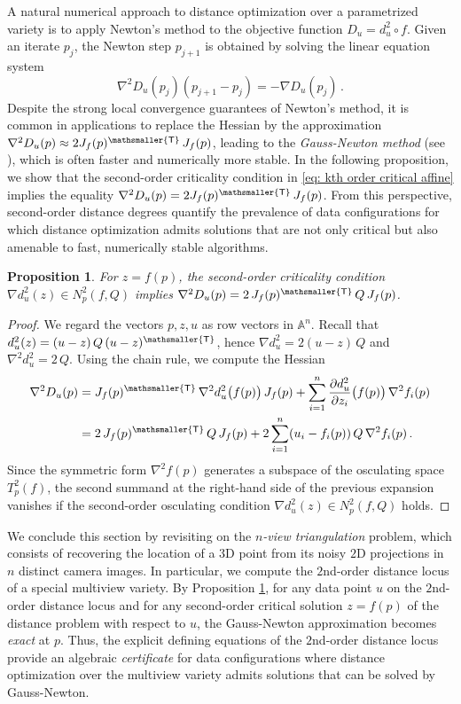 \documentclass[11pt,reqno]{amsart}
\numberwithin{equation}{section}
\theoremstyle{plain}
\numberwithin{theorem}{section}
\newtheorem{proposition}[theorem]{Proposition}
\theoremstyle{definition}
\newcommand{\A}{\mathbb{A}}
\newcommand{\mT}{\mathsmaller{\mathsf{T}}}
\begin{document}
A natural numerical approach to distance optimization over a parametrized variety is to apply Newton's method to the objective function $D_u = d_u^2 \circ f$.
Given an iterate $p_j$, the Newton step $p_{j+1}$ is obtained by solving the linear equation system
\[
    \nabla^2 D_u(p_j)(p_{j+1} - p_j) =  - \nabla D_u(p_j)\,.
\]
Despite the strong local convergence guarantees of Newton's method, it is common in applications to replace the Hessian by the approximation $\nabla^2 D_u(p) \approx 2J_f(p)^\mT\,J_f(p)$, leading to the {\em Gauss-Newton method} (see \cite[Chapter 10.2]{dennis1996numerical}), which is often faster and numerically more stable.
In the following proposition, we show that the second-order criticality condition in \eqref{eq: kth order critical affine} implies the equality $\nabla^2 D_u(p) = 2J_f(p)^\mT\,J_f(p)$. From this perspective, second-order distance degrees quantify the prevalence of data configurations for which distance optimization admits solutions that are not only critical but also amenable to fast, numerically stable algorithms.
\begin{proposition}\label{prop: hessian}
For $z = f(p)$, the second-order criticality condition $\nabla d_u^2(z)\in N_p^2(f,Q)$ implies $\nabla^2D_u(p) = 2\,J_f(p)^\mT\,Q\,J_f(p)$.
\end{proposition}
\begin{proof}
We regard the vectors $p,z,u$ as row vectors in $\A^n$. Recall that $d_u^2(z)=(u-z)\,Q\,(u-z)^\mT$, hence $\nabla d_u^2 = 2(u-z)\,Q$ and $\nabla^2 d_u^2 = 2\,Q$.
Using the chain rule, we compute the Hessian
\begin{align*}
    \nabla^2D_u(p) &= J_f(p)^\mT\,\nabla^2 d_u^2\bigl(f(p)\bigr)\,J_f(p)+\sum_{i=1}^n\frac{\partial d_u^2}{\partial z_i}\bigl(f(p)\bigr)\,\nabla^2 f_i(p)\\
    &= 2\,J_f(p)^\mT\,Q\,J_f(p)+2\sum_{i=1}^n (u_i-f_i(p))\,Q\,\nabla^2 f_i(p)\,.
\end{align*}
Since the symmetric form $\nabla^2 f(p)$ generates a subspace of the osculating space $T_p^2(f)$, the second summand at the right-hand side of the previous expansion vanishes if the second-order osculating condition $\nabla d_u^2(z)\in N_p^2(f,Q)$ holds.
\end{proof}
We conclude this section by revisiting \cite[Example 3.3]{DHOST} on the {\em $n$-view triangulation} problem, which consists of recovering the location of a $3$D point from its noisy $2$D projections in $n$ distinct camera images.
In particular, we compute the $2$nd-order distance locus of a special multiview variety.
By Proposition \ref{prop: hessian}, for any data point $u$ on the $2$nd-order distance locus and for any second-order critical
solution $z=f(p)$ of the distance problem with respect to $u$, the Gauss-Newton approximation becomes {\em exact} at $p$.
Thus, the explicit defining equations of the $2$nd-order distance locus provide an algebraic {\em certificate} for data configurations where distance optimization over the multiview variety admits solutions that can be solved by Gauss-Newton.
\end{document}
